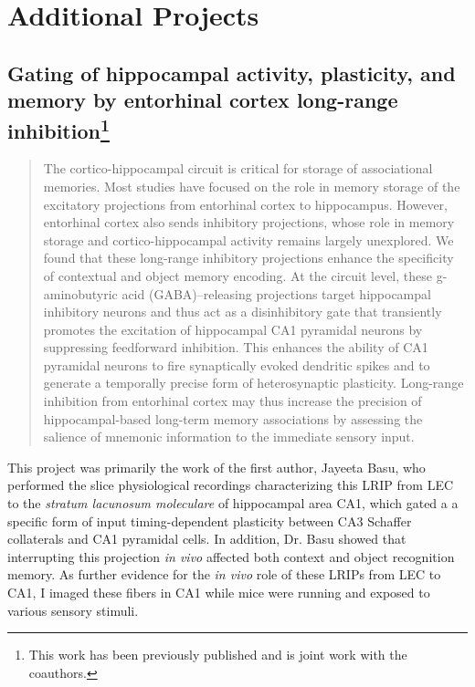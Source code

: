 \acresetall
\chapter{Additional Projects}
\label{ch:other}


\section[Gating of hippocampal activity, plasticity, and memory by entorhinal cortex long-range inhibition]{Gating of hippocampal activity, plasticity, and memory by entorhinal cortex long-range inhibition\footnote{This work has been previously published \citep{Basu2016} and is joint work with the coauthors.}}
\label{sec:other:LRIP}

\begin{quote}
The cortico-hippocampal circuit is critical for storage of associational memories. Most studies have focused on the role in memory storage of the excitatory projections from entorhinal cortex to hippocampus. However, entorhinal cortex also sends inhibitory projections, whose role in memory storage and cortico-hippocampal activity remains largely unexplored. We found that these long-range inhibitory projections enhance the specificity of contextual and object memory encoding. At the circuit level, these g-aminobutyric acid (GABA)–releasing projections target hippocampal inhibitory neurons and thus act as a disinhibitory gate that transiently promotes the excitation of hippocampal CA1 pyramidal neurons by suppressing feedforward inhibition. This enhances the ability of CA1 pyramidal neurons to fire synaptically evoked dendritic spikes and to generate a temporally precise form of heterosynaptic plasticity. Long-range inhibition from entorhinal cortex may thus increase the precision of hippocampal-based long-term memory associations by assessing the salience of mnemonic information to the immediate sensory input.
\end{quote}

This project was primarily the work of the first author, Jayeeta Basu, who performed the slice physiological recordings characterizing this \ac{LRIP} from \ac{LEC} to the \emph{stratum lacunosum moleculare} of hippocampal area CA1, which gated a a specific form of input timing-dependent plasticity between CA3 Schaffer collaterals and CA1 pyramidal cells. In addition, Dr. Basu showed that interrupting this projection \emph{in vivo} affected both context and object recognition memory. As further evidence for the \emph{in vivo} role of these LRIPs from LEC to CA1, I imaged these fibers in CA1 while mice were running and exposed to various sensory stimuli.

